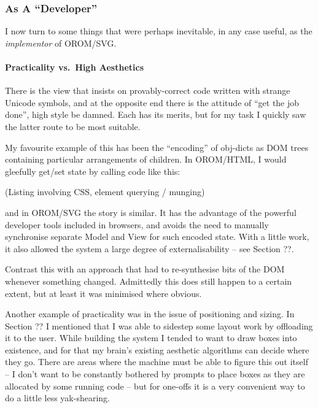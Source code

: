 \documentclass[english,submission]{programming}
\begin{document}
\hypertarget{as-a-developer}{%
\subsubsection{As A ``Developer''}\label{as-a-developer}}

I now turn to some things that were perhaps inevitable, in any case
useful, as the \emph{implementor} of OROM/SVG.

\hypertarget{practicality-vs.-high-aesthetics}{%
\paragraph{Practicality vs.~High
Aesthetics}\label{practicality-vs.-high-aesthetics}}

There is the view that insists on provably-correct code written with
strange Unicode symbols, and at the opposite end there is the attitude
of ``get the job done'', high style be damned. Each has its merits, but
for my task I quickly saw the latter route to be most suitable.

My favourite example of this has been the ``encoding'' of obj-dicts as
DOM trees containing particular arrangements of children. In OROM/HTML,
I would gleefully get/set state by calling code like this:

(Listing involving CSS, element querying / munging)

and in OROM/SVG the story is similar. It has the advantage of the
powerful developer tools included in browsers, and avoids the need to
manually synchronise separate Model and View for such encoded state.
With a little work, it also allowed the system a large degree of
externalisability -- see Section ??.

Contrast this with an approach that had to re-synthesise bits of the DOM
whenever something changed. Admittedly this does still happen to a
certain extent, but at least it was minimised where obvious.

Another example of practicality was in the issue of positioning and
sizing. In Section ?? I mentioned that I was able to sidestep some
layout work by offloading it to the user. While building the system I
tended to want to draw boxes into existence, and for that my brain's
existing aesthetic algorithms can decide where they go. There are areas
where the machine must be able to figure this out itself -- I don't want
to be constantly bothered by prompts to place boxes as they are
allocated by some running code -- but for one-offs it is a very
convenient way to do a little less yak-shearing.
\end{document}
